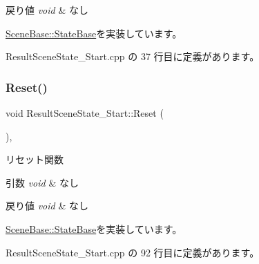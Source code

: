 \begin{DoxyRetVals}{戻り値}
{\em void} & なし \\
\hline
\end{DoxyRetVals}


\mbox{\hyperlink{class_scene_base_1_1_state_base_a33350231b039a2178c19beac0211c5b8}{Scene\+Base\+::\+State\+Base}}を実装しています。



 Result\+Scene\+State\+\_\+\+Start.\+cpp の 37 行目に定義があります。

\mbox{\label{class_result_scene_state___start_a8f776a7b2d31451c434fb74ffdd65960}} 
\subsubsection{\texorpdfstring{Reset()}{Reset()}}
{\footnotesize\ttfamily void Result\+Scene\+State\+\_\+\+Start\+::\+Reset (\begin{DoxyParamCaption}{ }\end{DoxyParamCaption})\hspace{0.3cm}{\ttfamily [override]}, {\ttfamily [virtual]}}



リセット関数 


\begin{DoxyParams}{引数}
{\em void} & なし \\
\hline
\end{DoxyParams}

\begin{DoxyRetVals}{戻り値}
{\em void} & なし \\
\hline
\end{DoxyRetVals}


\mbox{\hyperlink{class_scene_base_1_1_state_base_a2e14a3afece0b1d8db9edcebf514a977}{Scene\+Base\+::\+State\+Base}}を実装しています。



 Result\+Scene\+State\+\_\+\+Start.\+cpp の 92 行目に定義があります。

\mbox{\label{class_result_scene_state___start_af5b9af607074e3296481a1660607fb9a}} 
